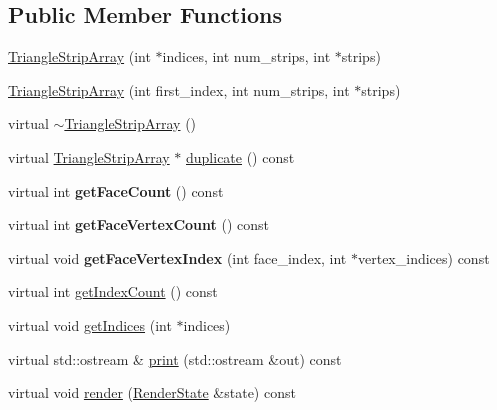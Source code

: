 \subsection*{Public Member Functions}
\begin{CompactItemize}
\item 
\hyperlink{classm3g_1_1TriangleStripArray_57d4e874819367084aeadb11593c4436}{TriangleStripArray} (int $\ast$indices, int num\_\-strips, int $\ast$strips)
\item 
\hyperlink{classm3g_1_1TriangleStripArray_d2ca9884a6ccf32da3cee977549b5ee0}{TriangleStripArray} (int first\_\-index, int num\_\-strips, int $\ast$strips)
\item 
virtual \hyperlink{classm3g_1_1TriangleStripArray_1cb3853bf79b7710d57044da818d2cde}{$\sim$TriangleStripArray} ()
\item 
virtual \hyperlink{classm3g_1_1TriangleStripArray}{TriangleStripArray} $\ast$ \hyperlink{classm3g_1_1TriangleStripArray_1623fbdfe91eb2e9d4a67bece6a46904}{duplicate} () const 
\item 
\hypertarget{classm3g_1_1TriangleStripArray_f4554e20b080880f27da67c539bb6748}{
virtual int \textbf{getFaceCount} () const }
\label{classm3g_1_1TriangleStripArray_f4554e20b080880f27da67c539bb6748}

\item 
\hypertarget{classm3g_1_1TriangleStripArray_007506f2b3f5563a65e4cfc1007d57ff}{
virtual int \textbf{getFaceVertexCount} () const }
\label{classm3g_1_1TriangleStripArray_007506f2b3f5563a65e4cfc1007d57ff}

\item 
\hypertarget{classm3g_1_1TriangleStripArray_d2721de0db09f6c65d9d4b088a269171}{
virtual void \textbf{getFaceVertexIndex} (int face\_\-index, int $\ast$vertex\_\-indices) const }
\label{classm3g_1_1TriangleStripArray_d2721de0db09f6c65d9d4b088a269171}

\item 
virtual int \hyperlink{classm3g_1_1TriangleStripArray_fe9ae2993ebcdb93d5ff26d57c81b73e}{getIndexCount} () const 
\item 
virtual void \hyperlink{classm3g_1_1TriangleStripArray_650953afac45099025a524ab160b911f}{getIndices} (int $\ast$indices)
\item 
virtual std::ostream \& \hyperlink{classm3g_1_1TriangleStripArray_6fea17fa1532df3794f8cb39cb4f911f}{print} (std::ostream \&out) const 
\item 
virtual void \hyperlink{classm3g_1_1TriangleStripArray_8babc8a79b78615da51161e94029eea9}{render} (\hyperlink{structm3g_1_1RenderState}{RenderState} \&state) const 
\end{CompactItemize}


